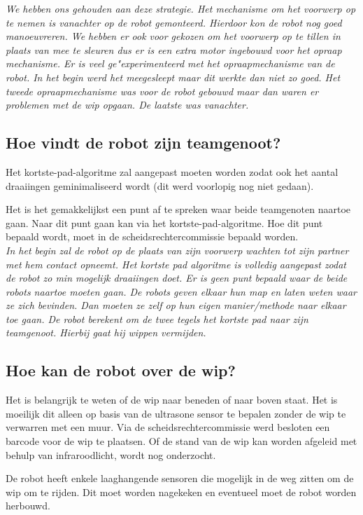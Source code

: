 \documentclass{peno}
\begin{document}
\textit{We hebben ons gehouden aan deze strategie. Het mechanisme om het voorwerp op te nemen is vanachter op de robot gemonteerd. Hierdoor kon de robot nog goed manoeuvreren. We hebben er ook voor gekozen om het voorwerp op te tillen in plaats van mee te sleuren dus er is een extra motor ingebouwd voor het opraap mechanisme. Er is veel ge"experimenteerd met het opraapmechanisme van de robot. In het begin werd het meegesleept maar dit werkte dan niet zo goed. Het tweede opraapmechanisme was voor de robot gebouwd maar dan waren er problemen met de wip opgaan. De laatste was vanachter. }

\subsection*{Hoe vindt de robot zijn teamgenoot?}
Het kortste-pad-algoritme zal aangepast moeten worden zodat ook het aantal draaiingen geminimaliseerd wordt (dit werd voorlopig nog niet gedaan).

Het is het gemakkelijkst een punt af te spreken waar beide teamgenoten naartoe gaan. Naar dit punt gaan kan via het kortste-pad-algoritme. Hoe dit punt bepaald wordt, moet in de scheidsrechtercommissie bepaald worden.\\

\textit{In het begin zal de robot op de plaats van zijn voorwerp wachten tot zijn partner met hem contact opneemt. Het kortste pad algoritme is volledig aangepast zodat de robot zo min mogelijk draaiingen doet. Er is geen punt bepaald waar de beide robots naartoe moeten gaan. De robots geven elkaar hun map en laten weten waar ze zich bevinden. Dan moeten ze zelf op hun eigen manier/methode naar elkaar toe gaan. De robot berekent om de twee tegels het kortste pad naar zijn teamgenoot. Hierbij gaat hij wippen vermijden.}

\subsection*{Hoe kan de robot over de wip?}
Het is belangrijk te weten of de wip naar beneden of naar boven staat. Het is moeilijk dit alleen op basis van de ultrasone sensor te bepalen zonder de wip te verwarren met een muur. Via de scheidsrechtercommissie werd besloten een barcode voor de wip te plaatsen. Of de stand van de wip kan worden afgeleid met behulp van infraroodlicht, wordt nog onderzocht.

De robot heeft enkele laaghangende sensoren die mogelijk in de weg zitten om de wip om te rijden. Dit moet worden nagekeken en eventueel moet de robot worden herbouwd.\\
\end{document}
